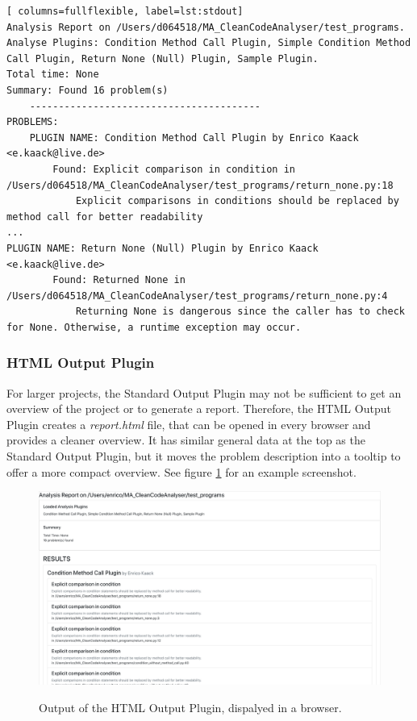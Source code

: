 \begin{minipage}[c]{\linewidth}
\begin{lstlisting}[ columns=fullflexible, label=lst:stdout]
Analysis Report on /Users/d064518/MA_CleanCodeAnalyser/test_programs.
Analyse Plugins: Condition Method Call Plugin, Simple Condition Method Call Plugin, Return None (Null) Plugin, Sample Plugin.
Total time: None
Summary: Found 16 problem(s)
    ----------------------------------------
PROBLEMS:
    PLUGIN NAME: Condition Method Call Plugin by Enrico Kaack <e.kaack@live.de>
        Found: Explicit comparison in condition in /Users/d064518/MA_CleanCodeAnalyser/test_programs/return_none.py:18
            Explicit comparisons in conditions should be replaced by method call for better readability
...
PLUGIN NAME: Return None (Null) Plugin by Enrico Kaack <e.kaack@live.de>
        Found: Returned None in /Users/d064518/MA_CleanCodeAnalyser/test_programs/return_none.py:4
            Returning None is dangerous since the caller has to check for None. Otherwise, a runtime exception may occur.
\end{lstlisting} 
\end{minipage}

\subsubsection{HTML Output Plugin}
For larger projects, the Standard Output Plugin may not be sufficient to get an overview of the project or to generate a report. Therefore, the HTML Output Plugin creates a \textit{report.html} file, that can be opened in every browser and provides a cleaner overview. It has similar general data at the top as the Standard Output Plugin, but it moves the problem description into a tooltip to offer a more compact overview. See figure \ref{fig:screen_html_output} for an example screenshot.

\begin{figure}
    \includegraphics[width=1\textwidth]{img/CCAP/screenshot_html_output.png}
    \label{fig:screen_html_output}
    \caption{Output of the HTML Output Plugin, dispalyed in a browser.}
\end{figure}

